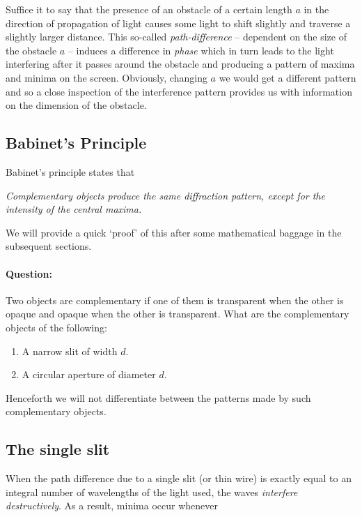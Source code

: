 Suffice it to say that the presence of an obstacle of a certain length $a$ in the direction of propagation of light causes some light to shift slightly and traverse a slightly larger distance. This so-called \textit{path-difference} -- dependent on the size of the obstacle $a$ -- induces a difference in \textit{phase} which in turn leads to the light interfering after it passes around the obstacle and producing a pattern of maxima and minima on the screen. Obviously, changing $a$ we would get a different pattern and so a close inspection of the interference pattern provides us with information on the dimension of the obstacle.

\subsection{Babinet's Principle}

Babinet's principle states that

\begin{center}
\textit{Complementary objects produce the same diffraction pattern, except for the intensity of the central maxima.}
\end{center}

We will provide a quick `proof' of this after some mathematical baggage in the subsequent sections. 

\begin{tcolorbox}
\paragraph{Question: }Two objects are complementary if one of them is transparent when the other is opaque and opaque when the other is transparent. What are the complementary objects of the following:

\begin{enumerate}
\item A narrow slit of width $d$.
\item A circular aperture of diameter $d$.
\end{enumerate}
\end{tcolorbox}

Henceforth we will not differentiate between the patterns made by such complementary objects.

\subsection{The single slit}

When the path difference due to a single slit (or thin wire) is exactly equal to an integral number of wavelengths of the light used, the waves \textit{interfere destructively}. As a result, minima occur whenever

